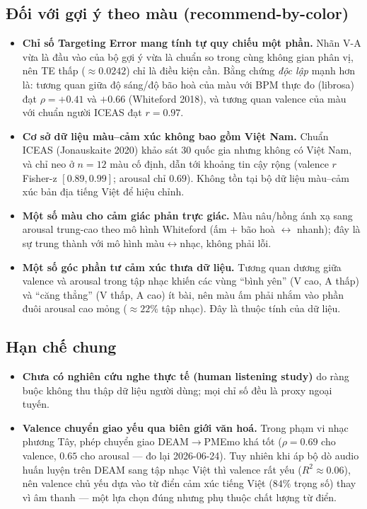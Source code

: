 \subsection{Đối với gợi ý theo màu (recommend-by-color)}
\begin{itemize}
  \item \textbf{Chỉ số Targeting Error mang tính tự quy chiếu một phần.} Nhãn V-A
        vừa là đầu vào của bộ gợi ý vừa là chuẩn so trong cùng không gian phân vị,
        nên TE thấp ($\approx 0.0242$) chỉ là điều kiện cần. Bằng chứng \emph{độc lập}
        mạnh hơn là: tương quan giữa độ sáng/độ bão hoà của màu với BPM thực đo
        (librosa) đạt $\rho = +0.41$ và $+0.66$ (Whiteford 2018), và tương quan
        valence của màu với chuẩn người ICEAS đạt $r = 0.97$.
  \item \textbf{Cơ sở dữ liệu màu--cảm xúc không bao gồm Việt Nam.} Chuẩn ICEAS
        (Jonauskaite 2020) khảo sát 30 quốc gia nhưng không có Việt Nam, và chỉ neo
        ở $n=12$ màu cố định, dẫn tới khoảng tin cậy rộng (valence $r$ Fisher-z
        $[0.89, 0.99]$; arousal chỉ $0.69$). Không tồn tại bộ dữ liệu màu--cảm xúc
        bản địa tiếng Việt để hiệu chỉnh.
  \item \textbf{Một số màu cho cảm giác phản trực giác.} Màu nâu/hồng ánh xạ sang
        arousal trung-cao theo mô hình Whiteford (ấm + bão hoà $\leftrightarrow$
        nhanh); đây là sự trung thành với mô hình màu$\leftrightarrow$nhạc, không
        phải lỗi.
  \item \textbf{Một số góc phần tư cảm xúc thưa dữ liệu.} Tương quan dương giữa
        valence và arousal trong tập nhạc khiến các vùng ``bình yên'' (V cao, A thấp)
        và ``căng thẳng'' (V thấp, A cao) ít bài, nên màu ấm phải nhắm vào phần đuôi
        arousal cao mỏng ($\approx 22\%$ tập nhạc). Đây là thuộc tính của dữ liệu.
\end{itemize}

\subsection{Hạn chế chung}
\begin{itemize}
  \item \textbf{Chưa có nghiên cứu nghe thực tế (human listening study)} do ràng
        buộc không thu thập dữ liệu người dùng; mọi chỉ số đều là proxy ngoại tuyến.
  \item \textbf{Valence chuyển giao yếu qua biên giới văn hoá.} Trong phạm vi
        nhạc phương Tây, phép chuyển giao DEAM$\to$PMEmo khá tốt ($\rho = 0.69$ cho
        valence, $0.65$ cho arousal --- đo lại 2026-06-24). Tuy nhiên khi áp bộ dò
        audio huấn luyện trên DEAM sang tập nhạc Việt thì valence rất yếu
        ($R^2 \approx 0.06$), nên valence chủ yếu dựa vào từ điển cảm xúc tiếng Việt
        ($84\%$ trọng số) thay vì âm thanh --- một lựa chọn đúng nhưng phụ thuộc
        chất lượng từ điển.
\end{itemize}
